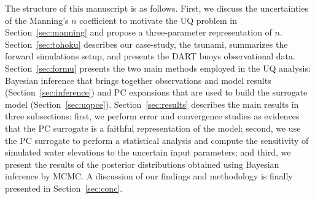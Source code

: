 The structure of this manuscript is as follows. First, we discuss the uncertainties 
of the Manning's $n$ coefficient to motivate the UQ problem in Section~\ref{sec:manning}
and propose a three-parameter representation of $n$. 
Section~\ref{sec:tohoku} describes our case-study, the \tohoku tsunami,
summarizes the forward simulations setup, and presents the DART buoys observational data. 
Section~\ref{sec:formu} presents the two main methods employed in the UQ analysis:
Bayesian inference that brings together observations 
and model results (Section~\ref{sec:inference}) 
and PC expansions that are used to build the surrogate model (Section~\ref{sec:uqpce}). Section~\ref{sec:results} describes the main results in 
three subsections: first, we perform error and convergence studies
as evidences that the PC surrogate is a faithful 
representation of the \geoclaw model; second, we use the PC surrogate to 
perform a statistical analysis and compute the  sensitivity of simulated water elevations
to the uncertain input parameters; and third, we present the results of the
posterior distributions obtained using Bayesian inference by MCMC. A discussion of our findings and methodology is finally presented in Section~\ref{sec:conc}.

